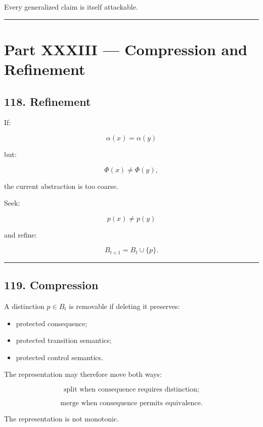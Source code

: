 \documentclass[
]{article}
\providecommand{\tightlist}{%
  \setlength{\itemsep}{0pt}\setlength{\parskip}{0pt}}
\begin{document}
Every generalized claim is itself attackable.

\begin{center}\rule{0.5\linewidth}{0.5pt}\end{center}

\section{Part XXXIII --- Compression and
Refinement}\label{part-xxxiii-compression-and-refinement}

\subsection{118. Refinement}\label{refinement}

If:

\[
\alpha(x)=\alpha(y)
\]

but:

\[
\Phi(x)\neq\Phi(y),
\]

the current abstraction is too coarse.

Seek:

\[
p(x)\neq p(y)
\]

and refine:

\[
B_{t+1}=B_t\cup\{p\}.
\]

\begin{center}\rule{0.5\linewidth}{0.5pt}\end{center}

\subsection{119. Compression}\label{compression}

A distinction \(p\in B_t\) is removable if deleting it preserves:

\begin{itemize}
\tightlist
\item
  protected consequence;
\item
  protected transition semantics;
\item
  protected control semantics.
\end{itemize}

The representation may therefore move both ways:

\[
\boxed{
\text{split when consequence requires distinction;}
}
\]

\[
\boxed{
\text{merge when consequence permits equivalence.}
}
\]

The representation is not monotonic.
\end{document}
